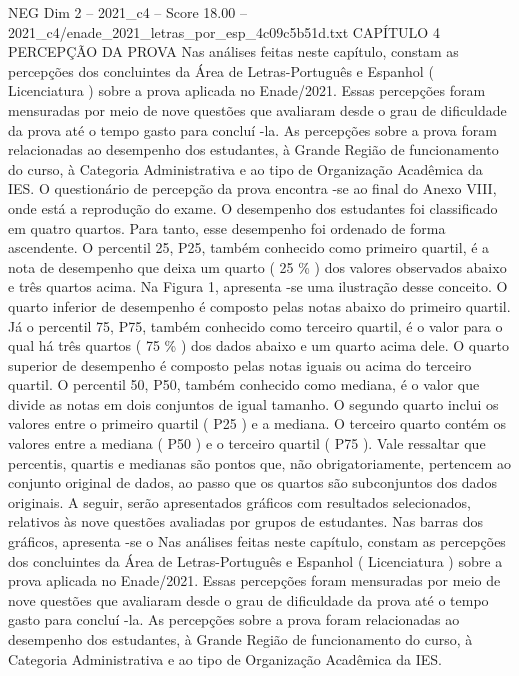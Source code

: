 \begin{textsample}{NEG Dim 2 – 2021\_c4 – Score 18.00 – 2021\_c4/enade\_2021\_letras\_por\_esp\_4c09c5b51d.txt}  \label{ex:f2_neg_401}
CAPÍTULO 4 PERCEPÇÃO DA PROVA Nas análises feitas neste capítulo, constam as percepções dos concluintes da Área de Letras-Português e Espanhol ( Licenciatura ) sobre a prova aplicada no Enade/2021.
Essas percepções foram mensuradas por meio de nove questões que avaliaram desde o grau de dificuldade da prova até o tempo gasto para concluí -la.
As percepções sobre a prova foram relacionadas ao desempenho dos estudantes, à Grande Região de funcionamento do curso, à Categoria Administrativa e ao tipo de Organização Acadêmica da IES.
O questionário de percepção da prova encontra -se ao final do Anexo VIII, onde está a reprodução do exame.
O desempenho dos estudantes foi classificado em quatro quartos.
Para tanto, esse desempenho foi ordenado de forma ascendente.
O percentil 25, P25, também conhecido como primeiro quartil, é a nota de desempenho que deixa um quarto ( 25 \% ) dos valores observados abaixo e três quartos acima.
Na Figura 1, apresenta -se uma ilustração desse conceito.
O quarto inferior de desempenho é composto pelas notas abaixo do primeiro quartil.
Já o percentil 75, P75, também conhecido como terceiro quartil, é o valor para o qual há três quartos ( 75 \% ) dos dados abaixo e um quarto acima dele.
O quarto superior de desempenho é composto pelas notas iguais ou acima do terceiro quartil.
O percentil 50, P50, também conhecido como mediana, é o valor que divide as notas em dois conjuntos de igual tamanho.
O segundo quarto inclui os valores entre o primeiro quartil ( P25 ) e a mediana.
O terceiro quarto contém os valores entre a mediana ( P50 ) e o terceiro quartil ( P75 ).
Vale ressaltar que percentis, quartis e medianas são pontos que, não obrigatoriamente, pertencem ao conjunto original de dados, ao passo que os quartos são subconjuntos dos dados originais.
A seguir, serão apresentados gráficos com resultados selecionados, relativos às nove questões avaliadas por grupos de estudantes.
Nas barras dos gráficos, apresenta -se o Nas análises feitas neste capítulo, constam as percepções dos concluintes da Área de Letras-Português e Espanhol ( Licenciatura ) sobre a prova aplicada no Enade/2021.
Essas percepções foram mensuradas por meio de nove questões que avaliaram desde o grau de dificuldade da prova até o tempo gasto para concluí -la.
As percepções sobre a prova foram relacionadas ao desempenho dos estudantes, à Grande Região de funcionamento do curso, à Categoria Administrativa e ao tipo de Organização Acadêmica da IES.

\end{textsample}
